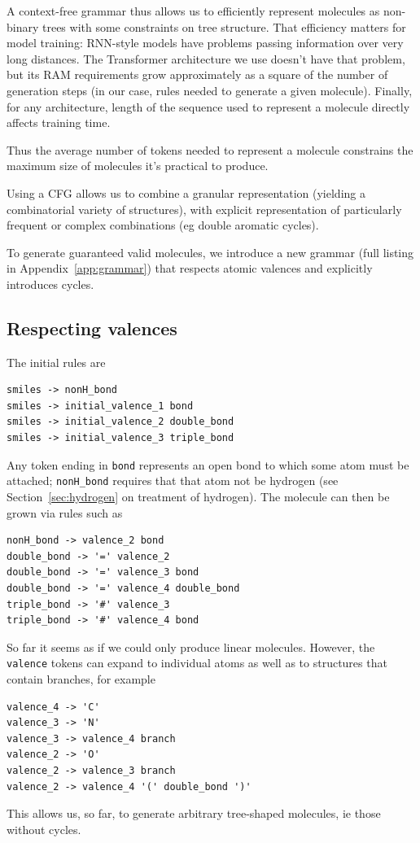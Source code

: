 \documentclass[11pt]{article}
\begin{document}
A context-free grammar thus allows us to efficiently represent molecules as non-binary trees with some constraints on tree structure. That efficiency matters for model training: RNN-style models have problems passing information over very long distances. The Transformer architecture we use doesn't have that problem, but its RAM requirements grow approximately as a square of the number of generation steps (in our case, rules needed to generate a given molecule). Finally, for any architecture, length of the sequence used to represent a molecule directly affects training time. 

Thus the average number of tokens needed to represent a molecule constrains the maximum size of molecules it's practical to produce.

Using a CFG allows us to combine a granular representation (yielding a combinatorial variety of structures), with explicit representation of particularly frequent or complex combinations (eg double aromatic cycles).

To generate guaranteed valid molecules, we introduce a new grammar (full listing in Appendix~\ref{app:grammar}) that respects atomic valences and explicitly introduces cycles.
\subsection{Respecting valences}
The initial rules are 
\begin{verbatim}
smiles -> nonH_bond
smiles -> initial_valence_1 bond
smiles -> initial_valence_2 double_bond
smiles -> initial_valence_3 triple_bond
\end{verbatim}
Any token ending in \verb|bond| represents an open bond to which some atom must be attached; \verb|nonH_bond| requires that that atom not be hydrogen (see Section~\ref{sec:hydrogen} on treatment of hydrogen). The molecule can then be grown via rules such as 
\begin{verbatim}
nonH_bond -> valence_2 bond
double_bond -> '=' valence_2
double_bond -> '=' valence_3 bond
double_bond -> '=' valence_4 double_bond
triple_bond -> '#' valence_3 
triple_bond -> '#' valence_4 bond
\end{verbatim}
So far it seems as if we could only produce linear molecules. However, the \verb|valence| tokens can expand to individual atoms as well as to structures that contain branches, for example
\begin{verbatim}
valence_4 -> 'C'
valence_3 -> 'N'
valence_3 -> valence_4 branch
valence_2 -> 'O'
valence_2 -> valence_3 branch
valence_2 -> valence_4 '(' double_bond ')'
\end{verbatim}
This allows us, so far, to generate arbitrary tree-shaped molecules, ie those without cycles.
\end{document}
